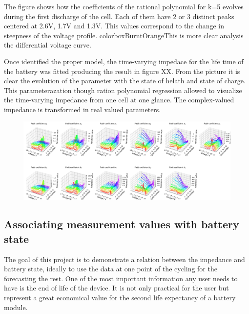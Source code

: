 The figure shows how the coefficients of the rational polynomial for k=5 evolves during the first discharge of the cell. Each of them have 2 or 3 distinct peaks centered at 2.6V, 1.7V and 1.3V. This values correspond to the change in steepness of the voltage profile. colorbox{BurntOrange}{This is more clear analysis the differential voltage curve.}

Once identified the proper model, the time-varying impedace for the life time of the battery was fitted producing the result in figure XX. From the picture it is clear the evolution of the parameter with the state of helath and state of charge. This parameterazation though ration polynomial regression allowed to visualize the time-varying impedance from one cell at one glance. The complex-valued impedance is transformed in real valued parameters.

\begin{figure}[h]
    \centering
    \includegraphics[width=\linewidth]{figures/application4/image10.png}
\end{figure}

\subsection{Associating measurement values with battery state}

The goal of this project is to demonstrate a relation between the impedance and battery state, ideally to use the data at one point of the cycling for the forecasting the rest. One of the most important information any user needs to have is the end of life of the device. It is not only practical for the user but represent a great economical value for the second life expectancy of a battery module. 

\newpage
